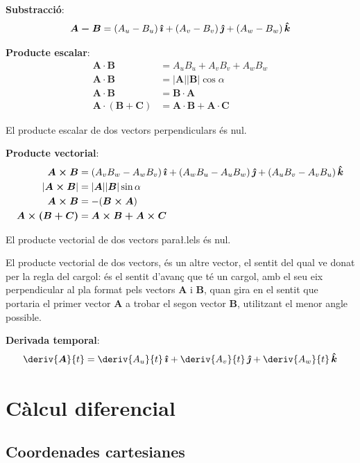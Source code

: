 \documentclass[catalan,a4paper,twoside,11pt]{article}
\begin{document}
\textbf{Substracci\'{o}}:
\begin{equation}
    \boldsymbol{A-B}= (A_u-B_u)\va + (A_v-B_v)\vb + (A_w-B_w)\vc
\end{equation}

\textbf{Producte escalar}:
\begin{align}
    \boldsymbol{A\cdot B} &= A_u B_u + A_v B_v + A_w B_w\\
    \boldsymbol{A\cdot B} &=|\boldsymbol{A}| |\boldsymbol{B}| \cos\alpha\\
    \boldsymbol{A\cdot B} &=\boldsymbol{B\cdot A}\\
    \boldsymbol{A\cdot(B+C)} &= \boldsymbol{A\cdot B+ A\cdot C}
\end{align}

El producte escalar de dos vectors perpendiculars  \'{e}s nul.

\textbf{Producte vectorial}:
\begin{align}
    \boldsymbol{A\times B} &= (A_v B_w - A_w B_v)\va + (A_w B_u - A_u B_w)\vb +
    (A_u B_v - A_v B_u)\vc \\
    |\boldsymbol{A\times B}| &=|\boldsymbol{A}| |\boldsymbol{B}| \sin\alpha\\
    \boldsymbol{A\times B} &=-(\boldsymbol{B\times A})\\
    \boldsymbol{A\times(B+C)} &= \boldsymbol{A\times B+ A\times C}
\end{align}

El producte vectorial de dos vectors para{\l.l}els  \'{e}s nul.

El producte vectorial de dos vectors, \'{e}s un altre vector, el
sentit del qual ve donat per la regla del cargol: \'{e}s el sentit
d'avan\c{c} que t\'{e} un cargol, amb el seu eix perpendicular al
pla format pels vectors  $\boldsymbol{A}$ i $\boldsymbol{B}$, quan
gira en el sentit que portaria el primer vector  $\boldsymbol{A}$ a
trobar el segon vector $\boldsymbol{B}$, utilitzant el menor angle
possible.

\textbf{Derivada temporal}:
\begin{equation}
    \deriv{\boldsymbol{A}}{t} = \deriv{A_u}{t}\va +
    \deriv{A_v}{t}\vb + \deriv{A_w}{t}\vc
\end{equation}


\section{C\`{a}lcul diferencial }

\subsection{Coordenades cartesianes}
\renewcommand{\va}{\ensuremath{\,\boldsymbol{\hat{\imath}}}}
\renewcommand{\vb}{\ensuremath{\,\boldsymbol{\hat{\jmath}}}}
\renewcommand{\vc}{\ensuremath{\,\boldsymbol{\hat{k}}}}
\end{document}
